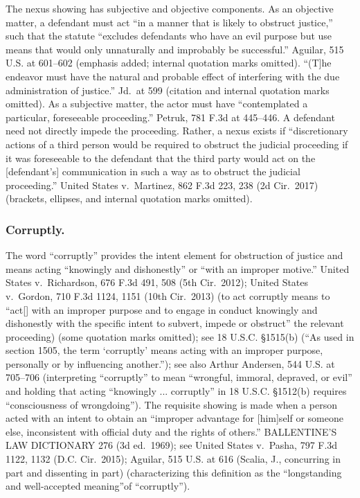 The nexus showing has subjective and objective components.
As an objective matter, a defendant must act “in a manner that is likely to obstruct justice,” such that the statute “excludes defendants who have an evil purpose but use means that would only unnaturally and improbably be successful.”
Aguilar, 515 U.S. at 601--602 (emphasis added; internal quotation marks omitted).
“(T]he endeavor must have the natural and probable effect of interfering with the due administration of justice.”
Jd.\ at 599 (citation and internal quotation marks omitted).
As a subjective matter, the actor must have “contemplated a particular, foreseeable proceeding.”
Petruk, 781 F.3d at 445--446.
A defendant need not directly impede the proceeding.
Rather, a nexus exists if “discretionary actions of a third person would be required to obstruct the judicial proceeding if it was foreseeable to the defendant that the third party would act on the [defendant’s] communication in such a way as to obstruct the judicial proceeding.”
United States v.\ Martinez, 862 F.3d 223, 238 (2d Cir.~2017) (brackets, ellipses, and internal quotation marks omitted).

\subsubsection*{Corruptly.}
The word “corruptly” provides the intent element for obstruction of justice and means acting “knowingly and dishonestly” or “with an improper motive.”
United States v.\ Richardson, 676 F.3d 491, 508 (5th Cir.~2012);
United States v.\ Gordon, 710 F.3d 1124, 1151 (10th Cir.~2013) (to act corruptly means to “act[] with an improper purpose and to engage in conduct knowingly and dishonestly with the specific intent to subvert, impede or obstruct” the relevant proceeding) (some quotation marks omitted);
see 18 U.S.C. \S 1515(b) (“As used in section 1505, the term ‘corruptly’ means acting with an improper purpose, personally or by influencing another.”);
see also Arthur Andersen, 544 U.S. at 705--706 (interpreting “corruptly” to mean “wrongful, immoral, depraved, or evil” and holding that acting “knowingly ... corruptly” in 18 U.S.C. \S 1512(b) requires “consciousness of wrongdoing”).
The requisite showing is made when a person acted with an intent to obtain an “improper advantage for [him]self or someone else, inconsistent with official duty and the rights of others.”
BALLENTINE’S LAW DICTIONARY 276 (3d ed.~1969);
see United States v.\ Pasha, 797 F.3d 1122, 1132 (D.C. Cir.~2015);
Aguilar, 515 U.S. at 616 (Scalia, J., concurring in part and dissenting in part) (characterizing this definition as the “longstanding and well-accepted meaning”of “corruptly”).

